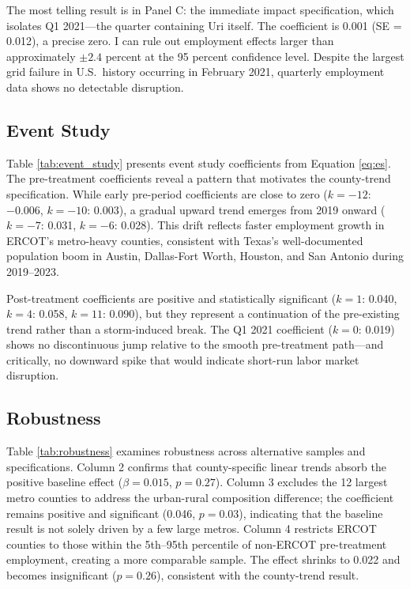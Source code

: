 \documentclass[12pt]{article}
\begin{document}
The most telling result is in Panel C: the immediate impact specification, which isolates Q1 2021---the quarter containing Uri itself. The coefficient is 0.001 (SE = 0.012), a precise zero. I can rule out employment effects larger than approximately $\pm 2.4$ percent at the 95 percent confidence level. Despite the largest grid failure in U.S.\ history occurring in February 2021, quarterly employment data shows no detectable disruption.

\subsection{Event Study}

Table \ref{tab:event_study} presents event study coefficients from Equation \ref{eq:es}. The pre-treatment coefficients reveal a pattern that motivates the county-trend specification. While early pre-period coefficients are close to zero ($k = -12$: $-0.006$, $k = -10$: 0.003), a gradual upward trend emerges from 2019 onward ($k = -7$: 0.031, $k = -6$: 0.028). This drift reflects faster employment growth in ERCOT's metro-heavy counties, consistent with Texas's well-documented population boom in Austin, Dallas-Fort Worth, Houston, and San Antonio during 2019--2023.

Post-treatment coefficients are positive and statistically significant ($k = 1$: 0.040, $k = 4$: 0.058, $k = 11$: 0.090), but they represent a continuation of the pre-existing trend rather than a storm-induced break. The Q1 2021 coefficient ($k = 0$: 0.019) shows no discontinuous jump relative to the smooth pre-treatment path---and critically, no downward spike that would indicate short-run labor market disruption.

\subsection{Robustness}

Table \ref{tab:robustness} examines robustness across alternative samples and specifications. Column 2 confirms that county-specific linear trends absorb the positive baseline effect ($\beta = 0.015$, $p = 0.27$). Column 3 excludes the 12 largest metro counties to address the urban-rural composition difference; the coefficient remains positive and significant (0.046, $p = 0.03$), indicating that the baseline result is not solely driven by a few large metros. Column 4 restricts ERCOT counties to those within the 5th--95th percentile of non-ERCOT pre-treatment employment, creating a more comparable sample. The effect shrinks to 0.022 and becomes insignificant ($p = 0.26$), consistent with the county-trend result.
\end{document}
